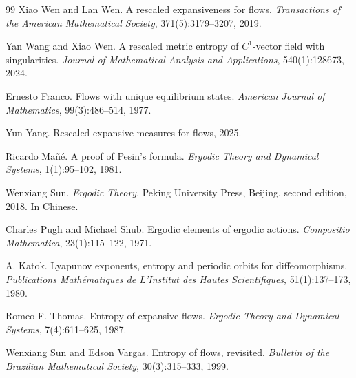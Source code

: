 \documentclass[10pt]{article}
\newtheorem*{Theorem A}{Theorem A}
\begin{document}
\begin{thebibliography}{99}
Xiao Wen and Lan Wen.
A rescaled expansiveness for flows.
\textit{Transactions of the American Mathematical Society},
371(5):3179--3207, 2019.

Yan Wang and Xiao Wen.
A rescaled metric entropy of $C^1$-vector field with singularities.
\textit{Journal of Mathematical Analysis and Applications},
540(1):128673, 2024.

Ernesto Franco.
Flows with unique equilibrium states.
\textit{American Journal of Mathematics},
99(3):486--514, 1977.

Yun Yang.
Rescaled expansive measures for flows,
2025.

Ricardo Ma\~n\'e.
A proof of Pesin's formula.
\textit{Ergodic Theory and Dynamical Systems},
1(1):95--102, 1981.

Wenxiang Sun.
\textit{Ergodic Theory}.
Peking University Press, Beijing, second edition, 2018. In Chinese.

Charles Pugh and Michael Shub.
Ergodic elements of ergodic actions.
\textit{Compositio Mathematica},
23(1):115--122, 1971.

A. Katok.
Lyapunov exponents, entropy and periodic orbits for diffeomorphisms.
\textit{Publications Math\'ematiques de L'Institut des Hautes Scientifiques},
51(1):137--173, 1980.

Romeo F. Thomas.
Entropy of expansive flows.
\textit{Ergodic Theory and Dynamical Systems},
7(4):611--625, 1987.

Wenxiang Sun and Edson Vargas.
Entropy of flows, revisited.
\textit{Bulletin of the Brazilian Mathematical Society},
30(3):315--333, 1999.

\end{thebibliography}
\end{document}
